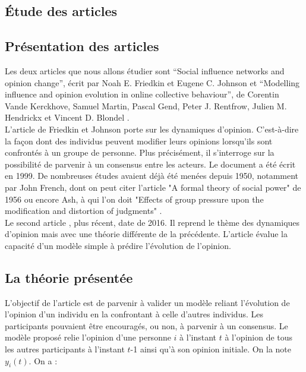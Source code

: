 \documentclass{scrreprt}
\begin{document}
\tableofcontents
\newpage
\begin{multicols}{2}

\chapter{Étude des articles}

\section{Présentation des articles}

Les deux articles que nous allons étudier sont “Social influence networks and opinion change”, écrit par Noah E. Friedkin et Eugene C. Johnson \cite{FJ} et “Modelling influence and opinion evolution in online collective behaviour”, de Corentin Vande Kerckhove, Samuel Martin, Pascal Gend, Peter J. Rentfrow, Julien M. Hendrickx et Vincent D. Blondel \cite{VMG}.\\

L’article \cite{FJ} de Friedkin et Johnson porte sur les dynamiques d’opinion. C’est-à-dire la façon dont des individus peuvent modifier leurs opinions lorsqu’ils sont confrontés à un groupe de personne. Plus précisément, il s’interroge sur la possibilité de parvenir à un consensus entre les acteurs. Le document a été écrit en 1999. De nombreuses études avaient déjà été menées depuis 1950, notamment par John French, dont on peut citer l'article "A formal theory of social power" \cite{French} de 1956 ou encore Ash, à qui l'on doit "Effects of group pressure upon the modification and distortion of judgments" \cite{Asch}.\\

Le second article \cite{VMG}, plus récent, date de 2016. Il reprend le thème des dynamiques d’opinion mais avec une théorie différente de la précédente. L'article évalue la capacité d'un modèle simple à prédire l'évolution de l'opinion.

\section{La théorie présentée}

L’objectif de l'article \cite{FJ} est de parvenir à valider un modèle reliant l’évolution de l’opinion d’un individu en la confrontant à celle d’autres individus. Les participants pouvaient être encouragés, ou non, à parvenir à un consensus. Le modèle proposé relie l’opinion d’une personne $i$ à l’instant $t$ à l’opinion de tous les autres participants à l’instant $t$-1 ainsi qu’à son opinion initiale. On la note $y_i(t)$. On a :\\


\end{multicols}
\end{document}
